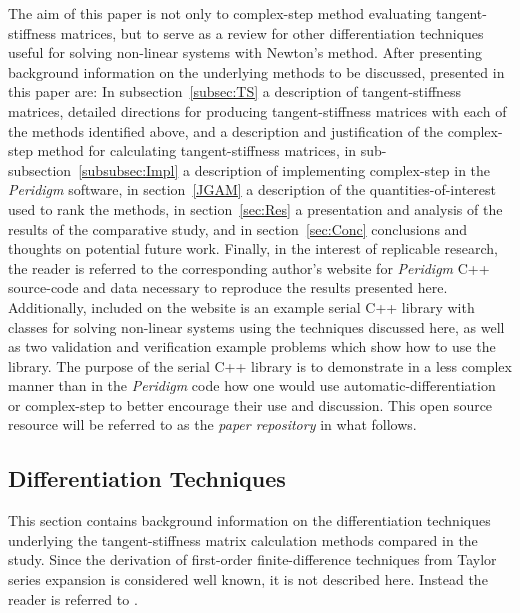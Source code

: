 \documentclass[preprint,12pt]{elsarticle}
\begin{document}
The aim of this paper is not only to  complex-step method  evaluating tangent-stiffness matrices, but to serve as a review
for other differentiation techniques useful for solving non-linear systems with
Newton's method. After presenting background information on the underlying
methods to be discussed, presented in this paper are: In subsection~\ref{subsec:TS} a description of
tangent-stiffness matrices, detailed directions for producing
tangent-stiffness matrices with each of the methods identified above, and a
description and justification of the complex-step method for calculating
tangent-stiffness matrices, in sub-subsection~\ref{subsubsec:Impl} a description of implementing complex-step in
the \emph{Peridigm} software, in section~\ref{JGAM} a description of the quantities-of-interest
used to rank the methods, in section~\ref{sec:Res} a presentation and analysis of the results of the
comparative study, and in section~\ref{sec:Conc} conclusions and thoughts on potential future work.
Finally, in the interest of replicable research, the reader is referred to the
corresponding author's website for \emph{Peridigm} C++ source-code and data
necessary to reproduce the results presented here. Additionally, included on
the website is an example serial C++ library with classes for solving
non-linear systems using the techniques discussed here, as well as two
validation and verification example problems which show how to use the library.
The purpose of the serial C++ library is to demonstrate in a less complex
manner than in the \emph{Peridigm} code how one would use
automatic-differentiation or complex-step to better encourage their use and
discussion. This open source resource will be referred to as the \emph{paper
repository} in what follows.

\subsection{Differentiation Techniques}

This section contains background information on the differentiation techniques
underlying the tangent-stiffness matrix calculation methods compared in the
study. Since the derivation of first-order finite-difference techniques from
Taylor series expansion is considered well known, it is not described here.
Instead the reader is referred to \cite[Chap. 4.1.3]{chapra2010}.
\end{document}
